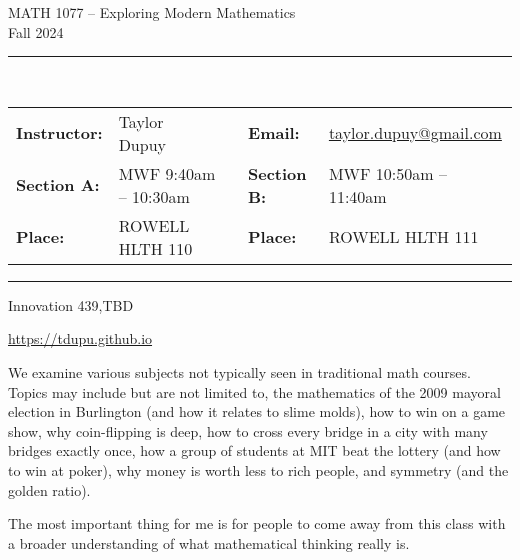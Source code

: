\documentclass[11pt, letterpaper]{article}
\theoremstyle{definition}
\theoremstyle{remark}
\begin{document}
\begin{center}
{\Large {\sc MATH 1077 -- Exploring Modern Mathematics}}
\\[1em]
{\large Fall 2024}
\end{center}

\begin{center}
	\rule{6in}{0.4pt}
	\\[2pt]
	\begin{tabular}{llcll}
		{\bf Instructor:} &Taylor Dupuy &\quad &	{\bf Email:}&\href{mailto:taylor.dupuy@gmail.com}{taylor.dupuy@gmail.com} \\
		{\bf Section A:} &MWF 9:40am -- 10:30am &\quad &{\bf Section B:} &MWF 10:50am -- 11:40am \\
		{\bf Place:} &ROWELL HLTH 110 &\quad &{\bf Place:} &ROWELL HLTH 111 \\
	\end{tabular}
	\rule{6in}{0.4pt}
\end{center}

\vspace{2em}

 Innovation 439,TBD
\vspace{1em}

 \url{https://tdupu.github.io}
\vspace{1em}

We examine various subjects not typically seen in traditional math courses. Topics may  include but are not limited to, the mathematics of the 2009 mayoral election in Burlington (and how it relates to slime molds),  how to win on a game show, why coin-flipping is deep, how to cross every bridge in a city with many bridges exactly once, how a group of students at MIT beat the lottery (and how to win at poker), why money is worth less to rich people, and symmetry (and the golden ratio).

\par 
The most important thing for me is for people to come away from this class with a broader understanding of what mathematical thinking really is.

\vspace{1em}
\end{document}
